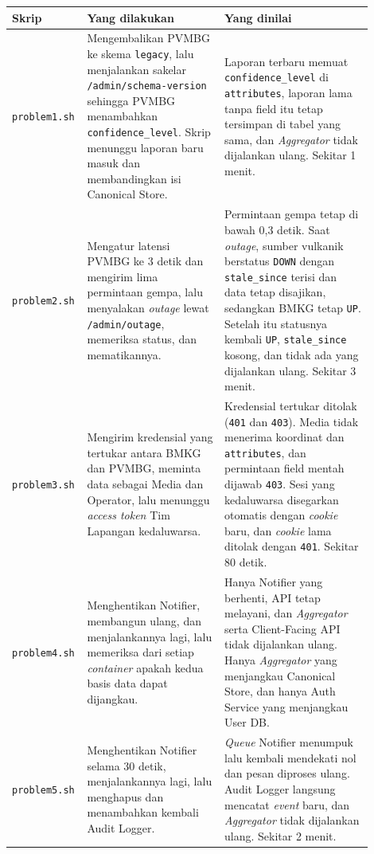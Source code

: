 \begin{longtable}[]{|>{\raggedright\arraybackslash}p{0.13\linewidth}|>{\raggedright\arraybackslash}p{0.37\linewidth}|>{\raggedright\arraybackslash}p{0.4\linewidth}|}
\hline
\textbf{Skrip} & \textbf{Yang dilakukan} & \textbf{Yang dinilai} \\
\hline
\endhead
\texttt{problem1.sh} & Mengembalikan PVMBG ke skema \texttt{legacy}, lalu menjalankan sakelar \texttt{/admin/schema-version} sehingga PVMBG menambahkan \texttt{confidence\_level}. Skrip menunggu laporan baru masuk dan membandingkan isi Canonical Store. & Laporan terbaru memuat \texttt{confidence\_level} di \texttt{attributes}, laporan lama tanpa field itu tetap tersimpan di tabel yang sama, dan \textit{Aggregator} tidak dijalankan ulang. Sekitar 1 menit. \\
\hline
\texttt{problem2.sh} & Mengatur latensi PVMBG ke 3 detik dan mengirim lima permintaan gempa, lalu menyalakan \textit{outage} lewat \texttt{/admin/outage}, memeriksa status, dan mematikannya. & Permintaan gempa tetap di bawah 0,3 detik. Saat \textit{outage}, sumber vulkanik berstatus \texttt{DOWN} dengan \texttt{stale\_since} terisi dan data tetap disajikan, sedangkan BMKG tetap \texttt{UP}. Setelah itu statusnya kembali \texttt{UP}, \texttt{stale\_since} kosong, dan tidak ada yang dijalankan ulang. Sekitar 3 menit. \\
\hline
\texttt{problem3.sh} & Mengirim kredensial yang tertukar antara BMKG dan PVMBG, meminta data sebagai Media dan Operator, lalu menunggu \textit{access token} Tim Lapangan kedaluwarsa. & Kredensial tertukar ditolak (\texttt{401} dan \texttt{403}). Media tidak menerima koordinat dan \texttt{attributes}, dan permintaan field mentah dijawab \texttt{403}. Sesi yang kedaluwarsa disegarkan otomatis dengan \textit{cookie} baru, dan \textit{cookie} lama ditolak dengan \texttt{401}. Sekitar 80 detik. \\
\hline
\texttt{problem4.sh} & Menghentikan Notifier, membangun ulang, dan menjalankannya lagi, lalu memeriksa dari setiap \textit{container} apakah kedua basis data dapat dijangkau. & Hanya Notifier yang berhenti, API tetap melayani, dan \textit{Aggregator} serta Client-Facing API tidak dijalankan ulang. Hanya \textit{Aggregator} yang menjangkau Canonical Store, dan hanya Auth Service yang menjangkau User DB. \\
\hline
\texttt{problem5.sh} & Menghentikan Notifier selama 30 detik, menjalankannya lagi, lalu menghapus dan menambahkan kembali Audit Logger. & \textit{Queue} Notifier menumpuk lalu kembali mendekati nol dan pesan diproses ulang. Audit Logger langsung mencatat \textit{event} baru, dan \textit{Aggregator} tidak dijalankan ulang. Sekitar 2 menit. \\
\hline
\end{longtable}

